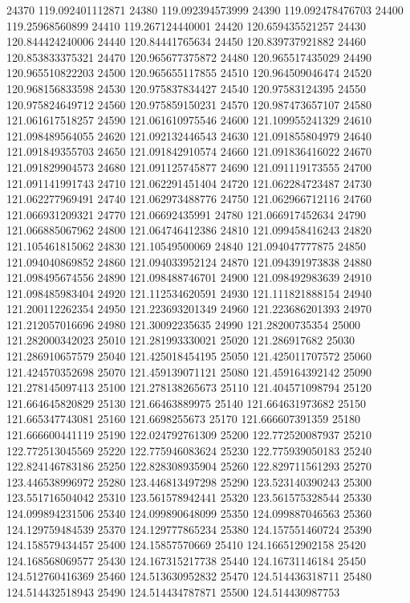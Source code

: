{24370 119.092401112871
24380 119.092394573999
24390 119.092478476703
24400 119.25968560899
24410 119.267124440001
24420 120.659435521257
24430 120.844424240006
24440 120.84441765634
24450 120.839737921882
24460 120.853833375321
24470 120.965677375872
24480 120.965517435029
24490 120.965510822203
24500 120.965655117855
24510 120.964509046474
24520 120.968156833598
24530 120.975837834427
24540 120.97583124395
24550 120.975824649712
24560 120.975859150231
24570 120.987473657107
24580 121.061617518257
24590 121.061610975546
24600 121.109955241329
24610 121.098489564055
24620 121.092132446543
24630 121.091855804979
24640 121.091849355703
24650 121.091842910574
24660 121.091836416022
24670 121.091829904573
24680 121.091125745877
24690 121.091119173555
24700 121.091141991743
24710 121.062291451404
24720 121.062284723487
24730 121.062277969491
24740 121.062973488776
24750 121.062966712116
24760 121.066931209321
24770 121.06692435991
24780 121.066917452634
24790 121.066885067962
24800 121.064746412386
24810 121.099458416243
24820 121.105461815062
24830 121.10549500069
24840 121.094047777875
24850 121.094040869852
24860 121.094033952124
24870 121.094391973838
24880 121.098495674556
24890 121.098488746701
24900 121.098492983639
24910 121.098485983404
24920 121.112534620591
24930 121.111821888154
24940 121.200112262354
24950 121.223693201349
24960 121.223686201393
24970 121.212057016696
24980 121.30092235635
24990 121.28200735354
25000 121.282000342023
25010 121.281993330021
25020 121.286917682
25030 121.286910657579
25040 121.425018454195
25050 121.425011707572
25060 121.424570352698
25070 121.459139071121
25080 121.459164392142
25090 121.278145097413
25100 121.278138265673
25110 121.404571098794
25120 121.664645820829
25130 121.66463889975
25140 121.664631973682
25150 121.665347743081
25160 121.6698255673
25170 121.666607391359
25180 121.666600441119
25190 122.024792761309
25200 122.772520087937
25210 122.772513045569
25220 122.775946083624
25230 122.775939050183
25240 122.824146783186
25250 122.828308935904
25260 122.829711561293
25270 123.446538996972
25280 123.446813497298
25290 123.523140390243
25300 123.551716504042
25310 123.561578942441
25320 123.561575328544
25330 124.099894231506
25340 124.099890648099
25350 124.099887046563
25360 124.129759484539
25370 124.129777865234
25380 124.157551460724
25390 124.158579434457
25400 124.15857570669
25410 124.166512902158
25420 124.168568069577
25430 124.167315217738
25440 124.16731146184
25450 124.512760416369
25460 124.513630952832
25470 124.514436318711
25480 124.514432518943
25490 124.514434787871
25500 124.514430987753
}
